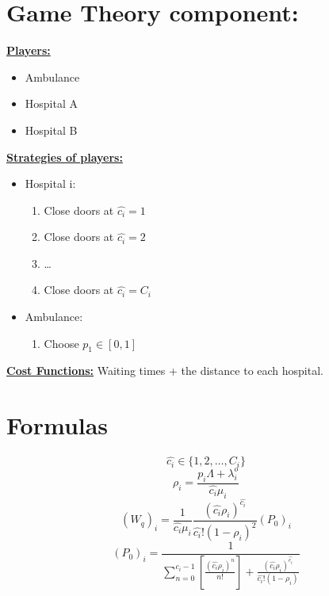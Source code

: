 \documentclass{article}
\begin{document}
\newpage

\section{Game Theory component:} 
\textbf{\underline{Players:}} 
\begin{itemize}
    \item Ambulance
    \item Hospital A
    \item Hospital B
\end{itemize}

\noindent 
\textbf{\underline{Strategies of players:}}
\begin{itemize}
    \item Hospital i:    
    \begin{enumerate} 
        \item Close doors at $\hat{c_i} = 1$ 
        \item Close doors at $\hat{c_i} = 2$
        \item \dots
        \item Close doors at $\hat{c_i} = C_i$
    \end{enumerate}
    \item Ambulance:
    \begin{enumerate}
        \item Choose $p_1 \in [0,1]$ 
    \end{enumerate}
\end{itemize}

\noindent 
\textbf{\underline{Cost Functions:}} Waiting times + the distance to each hospital. 









\section{Formulas}
$$\hat{c_i} \in \{1,2, \dots, C_i\} $$
$$ \rho_i = \frac{p_i \Lambda + \lambda_i^o}{\hat{c_i}\mu_i} $$
$$ (W_q)_i = \frac{1}{\hat{c_i} \mu_i} \frac{(\hat{c_i} \rho_i)^{\hat{c_i}}}{\hat{c_i}!(1-\rho_i)^2}(P_0)_i $$
$$ (P_0)_i = \frac{1}{\sum_{n = 0}^{\hat{c_i} - 1} \left[ \frac{(\hat{c_i} \rho_i)^n}{n!} \right] + \frac{(\hat{c_i}\rho_i)^{\hat{c_i}}}{\hat{c_i}!(1-\rho_i)}} $$
\end{document}
